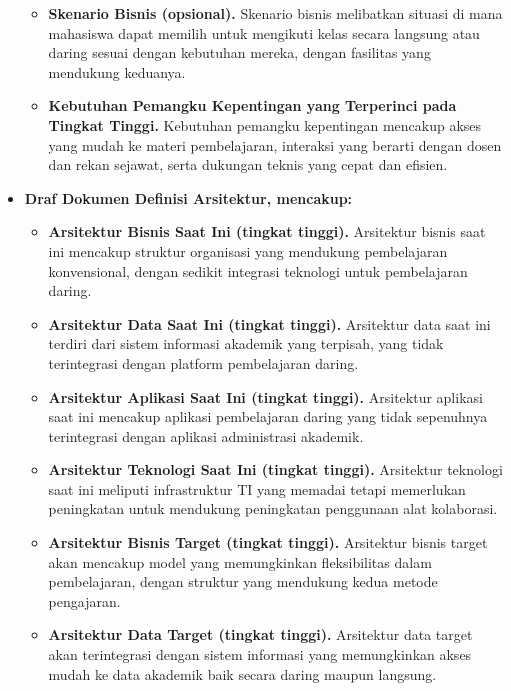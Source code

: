\begin{itemize}
\begin{itemize}
		\item \textbf{Skenario Bisnis (opsional).} 
		Skenario bisnis melibatkan situasi di mana mahasiswa dapat memilih untuk mengikuti kelas secara langsung atau daring sesuai dengan kebutuhan mereka, dengan fasilitas yang mendukung keduanya.
		
		\item \textbf{Kebutuhan Pemangku Kepentingan yang Terperinci pada Tingkat Tinggi.} 
		Kebutuhan pemangku kepentingan mencakup akses yang mudah ke materi pembelajaran, interaksi yang berarti dengan dosen dan rekan sejawat, serta dukungan teknis yang cepat dan efisien.
	\end{itemize}
	
	\item \textbf{Draf Dokumen Definisi Arsitektur, mencakup:}
	\begin{itemize}
		\item \textbf{Arsitektur Bisnis Saat Ini (tingkat tinggi).} 
		Arsitektur bisnis saat ini mencakup struktur organisasi yang mendukung pembelajaran konvensional, dengan sedikit integrasi teknologi untuk pembelajaran daring.
		
		\item \textbf{Arsitektur Data Saat Ini (tingkat tinggi).} 
		Arsitektur data saat ini terdiri dari sistem informasi akademik yang terpisah, yang tidak terintegrasi dengan platform pembelajaran daring.
		
		\item \textbf{Arsitektur Aplikasi Saat Ini (tingkat tinggi).} 
		Arsitektur aplikasi saat ini mencakup aplikasi pembelajaran daring yang tidak sepenuhnya terintegrasi dengan aplikasi administrasi akademik.
		
		\item \textbf{Arsitektur Teknologi Saat Ini (tingkat tinggi).} 
		Arsitektur teknologi saat ini meliputi infrastruktur TI yang memadai tetapi memerlukan peningkatan untuk mendukung peningkatan penggunaan alat kolaborasi.
		
		\item \textbf{Arsitektur Bisnis Target (tingkat tinggi).} 
		Arsitektur bisnis target akan mencakup model yang memungkinkan fleksibilitas dalam pembelajaran, dengan struktur yang mendukung kedua metode pengajaran.
		
		\item \textbf{Arsitektur Data Target (tingkat tinggi).} 
		Arsitektur data target akan terintegrasi dengan sistem informasi yang memungkinkan akses mudah ke data akademik baik secara daring maupun langsung.
		

\end{itemize}
\end{itemize}
